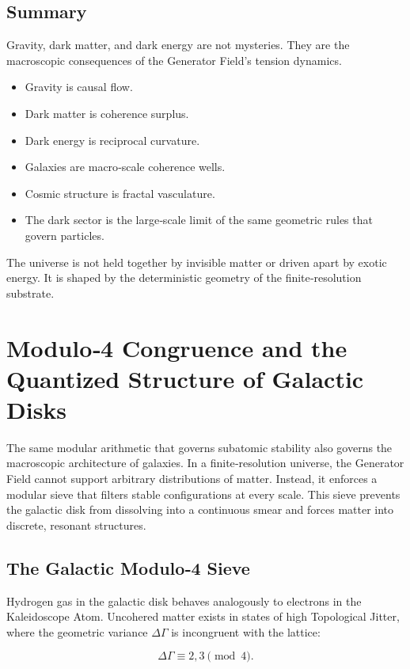 \documentclass[reprint,amsmath,amssymb,aps,prl,floatfix]{revtex4-2}
\begin{document}
\begin{itemize}
\subsection{Summary}

Gravity, dark matter, and dark energy are not mysteries.  
They are the macroscopic consequences of the Generator Field’s tension dynamics.
\begin{itemize}
\item Gravity is causal flow.  
\item Dark matter is coherence surplus.  
\item Dark energy is reciprocal curvature.  
\item Galaxies are macro‑scale coherence wells.  
\item Cosmic structure is fractal vasculature.  
\item The dark sector is the large‑scale limit of the same geometric rules that govern particles.
\end{itemize}

The universe is not held together by invisible matter or driven apart by exotic energy.  
It is shaped by the deterministic geometry of the finite‑resolution substrate.

\section{Modulo‑4 Congruence and the Quantized Structure of Galactic Disks}

The same modular arithmetic that governs subatomic stability also governs the macroscopic architecture of galaxies. In a finite‑resolution universe, the Generator Field cannot support arbitrary distributions of matter. Instead, it enforces a modular sieve that filters stable configurations at every scale. This sieve prevents the galactic disk from dissolving into a continuous smear and forces matter into discrete, resonant structures.

\subsection{The Galactic Modulo‑4 Sieve}

Hydrogen gas in the galactic disk behaves analogously to electrons in the Kaleidoscope Atom. Uncohered matter exists in states of high Topological Jitter, where the geometric variance \(\Delta\Gamma\) is incongruent with the lattice:

\[
\Delta\Gamma \equiv 2,3 \pmod{4}.
\]


\end{itemize}
\end{document}
